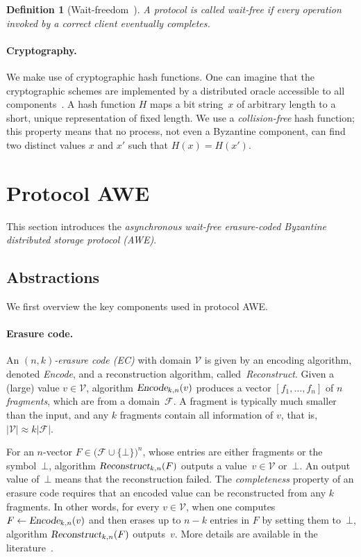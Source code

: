 \documentclass[oribibl]{llncs}
\theoremstyle{definition-boldhead}
\newtheorem{definition}{Definition}
\newcommand{\op}[1]{\textsl{#1}}
\newcommand{\becomes}{\ensuremath{\leftarrow}}
\newcommand{\values}{\ensuremath{\mathcal{V}}\xspace}
\newcommand{\fragments}{\ensuremath{\mathcal{F}}\xspace}
\newcommand{\NAME}{AWE\xspace}
\begin{document}
\begin{definition}[Wait-freedom~\cite{herlih91}]
  A protocol is called \emph{wait-free} if every operation invoked by
  a correct client eventually completes.
\end{definition}
\fi


\paragraph{Cryptography.}
We make use of cryptographic hash functions.
One can imagine that the cryptographic schemes are implemented by a
distributed oracle accessible to all components~\cite{CachinGR11}.  A
hash function $H$ maps a bit string~$x$ of arbitrary length to a
short, unique representation of fixed length.  We use a
\emph{collision-free} hash function; this property means that no
process, not even a Byzantine component, can find two distinct values
$x$ and $x'$ such that $H(x) = H(x')$.


\section{Protocol \NAME}
\label{sec:protocol}

\if\submit\no
This section introduces the \emph{asynchronous wait-free erasure-coded
Byzantine distributed storage protocol (AWE)}.



\subsection{Abstractions}
\fi

\if\submit\yes
We first overview the key components used in protocol \NAME.
\fi

\paragraph{Erasure code.}
An \emph{$(n, k)$-erasure code (EC)} with domain \values is given by
an encoding algorithm, denoted \op{Encode}, and a reconstruction
algorithm, called~\op{Reconstruct}.
Given a (large) value $v \in \values$, algorithm
$\op{Encode}_{k,n}(v)$ produces a vector $[f_1, \dots, f_n]$ of $n$
\emph{fragments}, which are from a domain~\fragments.  A fragment is
typically much smaller than the input, and any $k$ fragments contain
all information of $v$, that is, $|\values| \approx k |\fragments|$.

For an $n$-vector $F \in \big(\fragments \cup \{\bot\}\big)^n$, whose
entries are either fragments or the symbol~$\bot$, algorithm
$\op{Reconstruct}_{k,n}(F)$ outputs a value~$v \in \values$ or~$\bot$.
An output value of~$\bot$ means that the reconstruction failed.  The
\emph{completeness} property of an erasure code requires that an encoded value
can be reconstructed from any $k$ fragments.
In other words, for every $v \in \values$, when one computes $F
\becomes \op{Encode}_{k,n}(v)$ and then erases up to $n-k$ entries in
$F$ by setting them to~$\bot$, algorithm $\op{Reconstruct}_{k,n}(F)$
outputs~$v$.
\if\submit\no
More details are available in the
literature~\cite{rabin89,plank05}.
\fi
\end{document}
